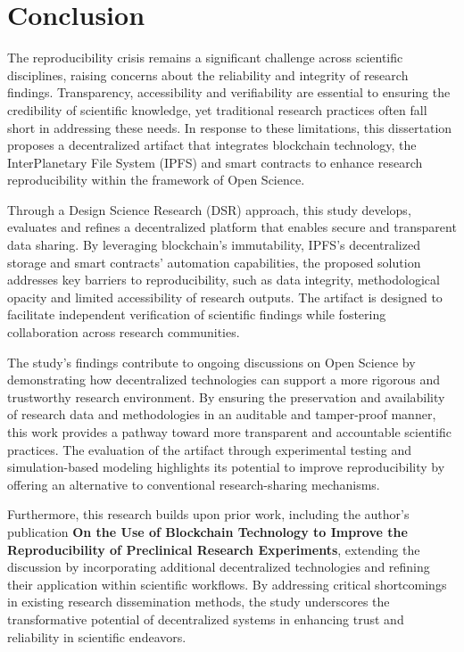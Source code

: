 \documentclass{article}
\begin{document}
\section{Conclusion}

The reproducibility crisis remains a significant challenge across scientific disciplines, raising concerns about the reliability and integrity of research findings. Transparency, accessibility and verifiability are essential to ensuring the credibility of scientific knowledge, yet traditional research practices often fall short in addressing these needs. In response to these limitations, this dissertation proposes a decentralized artifact that integrates blockchain technology, the InterPlanetary File System (IPFS) and smart contracts to enhance research reproducibility within the framework of Open Science.

Through a Design Science Research (DSR) approach, this study develops, evaluates and refines a decentralized platform that enables secure and transparent data sharing. By leveraging blockchain’s immutability, IPFS’s decentralized storage and smart contracts’ automation capabilities, the proposed solution addresses key barriers to reproducibility, such as data integrity, methodological opacity and limited accessibility of research outputs. The artifact is designed to facilitate independent verification of scientific findings while fostering collaboration across research communities.

The study’s findings contribute to ongoing discussions on Open Science by demonstrating how decentralized technologies can support a more rigorous and trustworthy research environment. By ensuring the preservation and availability of research data and methodologies in an auditable and tamper-proof manner, this work provides a pathway toward more transparent and accountable scientific practices. The evaluation of the artifact through experimental testing and simulation-based modeling highlights its potential to improve reproducibility by offering an alternative to conventional research-sharing mechanisms.

Furthermore, this research builds upon prior work, including the author’s publication \textbf{On the Use of Blockchain Technology to Improve the Reproducibility of Preclinical Research Experiments}, extending the discussion by incorporating additional decentralized technologies and refining their application within scientific workflows. By addressing critical shortcomings in existing research dissemination methods, the study underscores the transformative potential of decentralized systems in enhancing trust and reliability in scientific endeavors.
\end{document}
